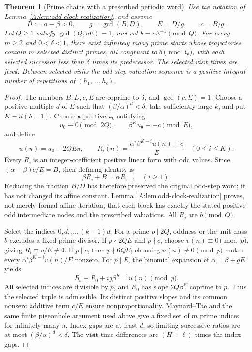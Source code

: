 \documentclass[11pt,a4paper]{article}
\newtheorem{theorem}{Theorem}[section]
\theoremstyle{definition}
\theoremstyle{remark}
\numberwithin{equation}{section}
\begin{document}
\begin{theorem}[Prime chains with a prescribed periodic word]
\label{A:thm:periodic-clock-primes}
Use the notation of Lemma~\ref{A:lem:odd-clock-realization}, and assume
\[
 D:=\alpha-\beta>0,\qquad
 g=\gcd(B,D),\qquad E=D/g,\qquad c=B/g.
\]
Let $Q\ge1$ satisfy $\gcd(Q,cE)=1$, and set
$b=cE^{-1}\pmod Q$. For every $m\ge2$ and $0<\delta<1$,
there exist infinitely many prime starts whose trajectories contain
$m$ selected distinct primes, all congruent to $b\pmod Q$, with each
selected successor less than $\delta$ times its predecessor.
The selected visit times are fixed. Between selected visits the
odd-step valuation sequence is a positive integral number of repetitions
of $(h_1,\ldots,h_\ell)$.
\end{theorem}
\begin{proof}
The numbers $B,D,c,E$ are coprime to $6$, and $\gcd(c,E)=1$.
Choose a positive multiple $d$ of $E$ such that
$(\beta/\alpha)^d<\delta$, take sufficiently large $k$, and put
$K=d(k-1)$. Choose a positive $u_0$ satisfying
\[
 u_0\equiv0\pmod{2Q},\qquad \beta^K u_0\equiv-c\pmod E,
\]
and define
\[
 u(n)=u_0+2QE n,\qquad
 R_i(n)=\frac{\alpha^i\beta^{K-i}u(n)+c}{E}
 \quad(0\le i\le K).
\]
Every $R_i$ is an integer-coefficient positive linear form with odd
values. Since $(\alpha-\beta)c/E=B$, their defining identity is
\[
 \beta R_i+B=\alpha R_{i-1}\quad(i\ge1).
\]
Reducing the fraction $B/D$ has therefore preserved the original odd-step
word; it has not changed its affine constant.
Lemma~\ref{A:lem:odd-clock-realization} proves, not merely formal affine
iteration, that each block has exactly the stated positive odd
intermediate nodes and the prescribed valuations. All $R_i$ are
$b\pmod Q$.

Select the indices $0,d,\ldots,(k-1)d$. For a prime $p\mid2Q$,
oddness or the unit class $b$ excludes a fixed prime divisor. If
$p\nmid2QE$ and $p\nmid c$, choose $u(n)\equiv0\pmod p$, giving
$R_i\equiv c/E\ne0$. If $p\mid c$, then $p\nmid6QE$; choosing
$u(n)\ne0\pmod p$ makes every
$\alpha^i\beta^{K-i}u(n)/E$ nonzero. For $p\mid E$, the binomial
expansion of $\alpha=\beta+gE$ yields
\[
 R_i\equiv R_0+ig\beta^{K-1}u(n)\pmod p.
\]
All selected indices are divisible by $p$, and $R_0$ has slope
$2Q\beta^K$ coprime to $p$. Thus the selected tuple is admissible.
Its distinct positive slopes and its common nonzero additive term
$c/E$ ensure nonproportionality. Maynard--Tao and the same finite
pigeonhole argument used above give a fixed set of $m$ prime indices
for infinitely many $n$. Index gaps are at least $d$, so limiting
successive ratios are at most $(\beta/\alpha)^d<\delta$.
The visit-time differences are $(H+\ell)$ times the index gaps.
\end{proof}
\end{document}
